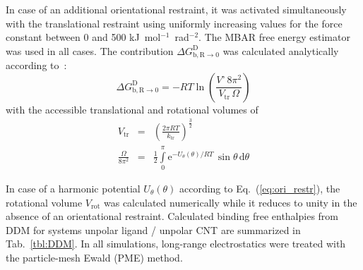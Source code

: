 \documentclass[9pt,lessons]{livecoms}
\begin{document}
In case of an additional orientational restraint, it was activated simultaneously with the translational restraint using uniformly increasing values for the force constant between 0 and 500 kJ~mol$^{-1}$~rad$^{-2}$.
The MBAR free energy estimator was used in all cases.
The contribution $\Delta G^\mathrm{D}_\mathrm{b, R \rightarrow 0}$ was calculated analytically according to~\cite{hermans1997inclusion}:
\begin{equation}
\Delta G^\mathrm{D}_\mathrm{b, R \rightarrow 0} =  - RT \ln \left(\frac{V^\circ \, 8 \pi^2}{V_\mathrm{tr} \, \Omega} \right) 
\label{eq:DGrottrans_DDM}
\end{equation}
%
with the accessible translational and rotational volumes of
\begin{eqnarray}
V_\mathrm{tr} & = & \left( \frac{2 \pi RT}{k_\mathrm{tr}}\right)^\frac{3}{2} \\
\frac{\Omega}{8 \pi^2} & = & \frac{1}{2} \int\limits_{0}^{\pi} \mathrm{e}^{- U_\theta(\theta)/RT} \, \sin\theta \, \mathrm{d}\theta
\end{eqnarray}


In case of a harmonic potential $U_\theta(\theta)$ according to Eq.~(\ref{eq:ori_restr}), the rotational volume $V_\mathrm{rot}$ was calculated numerically while it reduces to unity in the absence of an orientational restraint. 
Calculated binding free enthalpies from DDM for systems unpolar ligand / unpolar CNT are summarized in Tab.~\ref{tbl:DDM}. 
In all simulations, long-range electrostatics were treated with  the particle-mesh Ewald (PME) method.
\end{document}
